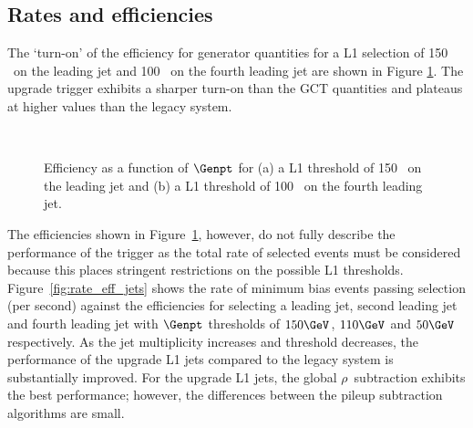 \subsection{Rates and efficiencies}

The `turn-on' of the efficiency for generator quantities for a L1 selection of 150 \GeV~on the leading jet
and 100 \GeV~on the fourth leading jet are shown in Figure \ref{fig:turnon}. The upgrade trigger exhibits a sharper turn-on
than the GCT quantities and plateaus at higher values than the legacy system. 

\begin{figure}
    \begin{center} 
	~
	\caption{Efficiency as a function of $\Genpt$ for (a) a L1 threshold of 150 \GeV~on the leading jet and (b) 
	a L1 threshold of 100 \GeV~on the fourth leading jet.}
	    \label{fig:turnon}
    \end{center} 
\end{figure}

The efficiencies shown in Figure~\ref{fig:turnon}, however, do not fully describe the performance 
of the trigger as the total rate of selected events must be considered because this places 
stringent restrictions on the possible L1 thresholds. Figure~\ref{fig:rate_eff_jets} shows the rate of 
minimum bias events passing selection (per second) against the efficiencies for selecting 
a leading jet, second leading jet and fourth leading jet with $\Genpt$ thresholds of $150 \GeV$,
$110 \GeV$ and $50 \GeV$ respectively. As the jet multiplicity increases and threshold decreases,
the performance of the upgrade L1 jets compared to the legacy system is substantially improved.
For the upgrade L1 jets, the global $\rho$~subtraction exhibits the best performance; however, the differences 
between the pileup subtraction algorithms are small.

